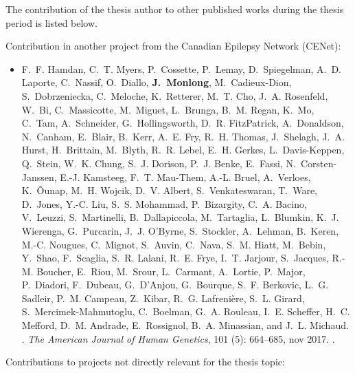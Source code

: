 
The contribution of the thesis author to other published works during the thesis period is listed below.
\bigskip

\noindent Contribution in another project from the Canadian Epilepsy Network (CENet):

\begin{itemize}  
\item F.~F. Hamdan, C.~T. Myers, P.~Cossette, P.~Lemay, D.~Spiegelman, A.~D. Laporte,
  C.~Nassif, O.~Diallo, {\bf J.~Monlong}, M.~Cadieux-Dion, S.~Dobrzeniecka,
  C.~Meloche, K.~Retterer, M.~T. Cho, J.~A. Rosenfeld, W.~Bi, C.~Massicotte,
  M.~Miguet, L.~Brunga, B.~M. Regan, K.~Mo, C.~Tam, A.~Schneider,
  G.~Hollingsworth, D.~R. FitzPatrick, A.~Donaldson, N.~Canham, E.~Blair,
  B.~Kerr, A.~E. Fry, R.~H. Thomas, J.~Shelagh, J.~A. Hurst, H.~Brittain,
  M.~Blyth, R.~R. Lebel, E.~H. Gerkes, L.~Davis-Keppen, Q.~Stein, W.~K. Chung,
  S.~J. Dorison, P.~J. Benke, E.~Fassi, N.~Corsten-Janssen, E.-J. Kamsteeg,
  F.~T. Mau-Them, A.-L. Bruel, A.~Verloes, K.~{\~{O}}unap, M.~H. Wojcik, D.~V.
  Albert, S.~Venkateswaran, T.~Ware, D.~Jones, Y.-C. Liu, S.~S. Mohammad,
  P.~Bizargity, C.~A. Bacino, V.~Leuzzi, S.~Martinelli, B.~Dallapiccola,
  M.~Tartaglia, L.~Blumkin, K.~J. Wierenga, G.~Purcarin, J.~J. O'Byrne,
  S.~Stockler, A.~Lehman, B.~Keren, M.-C. Nougues, C.~Mignot, S.~Auvin,
  C.~Nava, S.~M. Hiatt, M.~Bebin, Y.~Shao, F.~Scaglia, S.~R. Lalani, R.~E.
  Frye, I.~T. Jarjour, S.~Jacques, R.-M. Boucher, E.~Riou, M.~Srour,
  L.~Carmant, A.~Lortie, P.~Major, P.~Diadori, F.~Dubeau, G.~D'Anjou,
  G.~Bourque, S.~F. Berkovic, L.~G. Sadleir, P.~M. Campeau, Z.~Kibar, R.~G.
  Lafreni{\`{e}}re, S.~L. Girard, S.~Mercimek-Mahmutoglu, C.~Boelman, G.~A.
  Rouleau, I.~E. Scheffer, H.~C. Mefford, D.~M. Andrade, E.~Rossignol, B.~A.
  Minassian, and J.~L. Michaud.
.
\newblock \emph{The American Journal of Human Genetics}, 101
  (5): 664--685, nov 2017.
\newblock {}.
\end{itemize}

\noindent Contributions to projects not directly relevant for the thesis topic:

